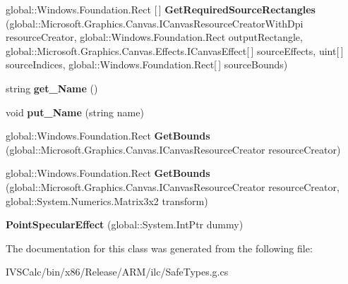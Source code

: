 \begin{DoxyCompactItemize}
\item 
\mbox{\label{class_microsoft_1_1_graphics_1_1_canvas_1_1_effects_1_1_point_specular_effect_ae9fda493781b1eb4e82c296beb9439c4}} 
global\+::\+Windows.\+Foundation.\+Rect \mbox{[}$\,$\mbox{]} {\bfseries Get\+Required\+Source\+Rectangles} (global\+::\+Microsoft.\+Graphics.\+Canvas.\+I\+Canvas\+Resource\+Creator\+With\+Dpi resource\+Creator, global\+::\+Windows.\+Foundation.\+Rect output\+Rectangle, global\+::\+Microsoft.\+Graphics.\+Canvas.\+Effects.\+I\+Canvas\+Effect\mbox{[}$\,$\mbox{]} source\+Effects, uint\mbox{[}$\,$\mbox{]} source\+Indices, global\+::\+Windows.\+Foundation.\+Rect\mbox{[}$\,$\mbox{]} source\+Bounds)
\item 
\mbox{\label{class_microsoft_1_1_graphics_1_1_canvas_1_1_effects_1_1_point_specular_effect_a1cbde374c472f69d6fa5f88e8337795d}} 
string {\bfseries get\+\_\+\+Name} ()
\item 
\mbox{\label{class_microsoft_1_1_graphics_1_1_canvas_1_1_effects_1_1_point_specular_effect_a262143cb151fd9bd26de07fd4a7faf3a}} 
void {\bfseries put\+\_\+\+Name} (string name)
\item 
\mbox{\label{class_microsoft_1_1_graphics_1_1_canvas_1_1_effects_1_1_point_specular_effect_ad2228b0b04682b6ae632c0697d7592e3}} 
global\+::\+Windows.\+Foundation.\+Rect {\bfseries Get\+Bounds} (global\+::\+Microsoft.\+Graphics.\+Canvas.\+I\+Canvas\+Resource\+Creator resource\+Creator)
\item 
\mbox{\label{class_microsoft_1_1_graphics_1_1_canvas_1_1_effects_1_1_point_specular_effect_a0a364b2d3accec51db9f8c9a0093f122}} 
global\+::\+Windows.\+Foundation.\+Rect {\bfseries Get\+Bounds} (global\+::\+Microsoft.\+Graphics.\+Canvas.\+I\+Canvas\+Resource\+Creator resource\+Creator, global\+::\+System.\+Numerics.\+Matrix3x2 transform)
\item 
\mbox{\label{class_microsoft_1_1_graphics_1_1_canvas_1_1_effects_1_1_point_specular_effect_a6e86c92b50a4d12d166a06487dc41ea0}} 
{\bfseries Point\+Specular\+Effect} (global\+::\+System.\+Int\+Ptr dummy)
\end{DoxyCompactItemize}


The documentation for this class was generated from the following file\+:\begin{DoxyCompactItemize}
\item 
I\+V\+S\+Calc/bin/x86/\+Release/\+A\+R\+M/ilc/Safe\+Types.\+g.\+cs\end{DoxyCompactItemize}
